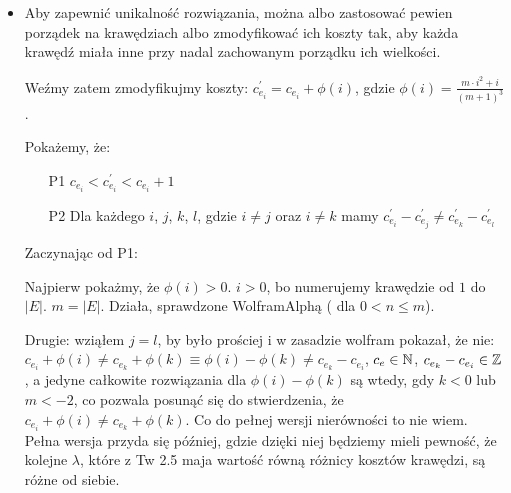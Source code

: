 \begin{itemize}
	\item Aby zapewnić unikalność rozwiązania, można albo zastosować pewien porządek na krawędziach albo zmodyfikować ich koszty tak, aby każda krawędź miała inne przy nadal zachowanym porządku ich wielkości.
	
	Weźmy zatem zmodyfikujmy koszty: $c^{\prime}_{e_{i}} = c_{e_{i}} + \phi \left( i \right)$, gdzie $\phi \left( i \right) = \frac{m \cdot i^{2} + i}{\left( m + 1 \right)^{3}}$.
	
	Pokażemy, że:
	
	\begin{itemize}
		\item[P1] $c_{e_{i}} < c^{\prime}_{e_{i}} < c_{e_{i}} + 1$
		\item[P2] Dla każdego $i$, $j$, $k$, $l$, gdzie $i \neq j$ oraz $i \neq k$ mamy $c^{\prime}_{e_{i}} - c^{\prime}_{e_{j}} \neq c^{\prime}_{e_{k}} - c^{\prime}_{e_{l}}$
	\end{itemize}
	
	Zaczynając od P1:
	
	Najpierw pokażmy, że $\phi \left( i \right) > 0$. $i > 0$, bo numerujemy krawędzie od $1$  do $\left| E \right|$. $m = \left| E \right|$. Działa, sprawdzone WolframAlphą ( dla $0 < n \leqslant m$). %
	
	Drugie: wziąłem $j = l$, by było prościej i w zasadzie wolfram pokazał, że nie: $c_{e_{i}} + \phi \left( i \right) \neq c_{e_{k}} + \phi \left( k \right) \equiv \phi \left( i \right) - \phi \left( k \right) \neq c_{e_{k}} - c_{e_{i}}$, $c_{e} \in \mathbb{N}$, $c_{e_{k}} - c_{e_{i}} \in \mathbb{Z}$, a jedyne całkowite rozwiązania dla $\phi \left( i \right) - \phi \left( k \right)$ są wtedy, gdy $k < 0$ lub $m < -2$, co pozwala posunąć się do stwierdzenia, że $c_{e_{i}} + \phi \left( i \right) \neq c_{e_{k}} + \phi \left( k \right)$. Co do pełnej wersji nierówności to nie wiem. Pełna wersja przyda się później, gdzie dzięki niej będziemy mieli pewność, że kolejne $\lambda$, które z Tw 2.5 maja wartość równą różnicy kosztów krawędzi, są różne od siebie.
	
	

\end{itemize}
